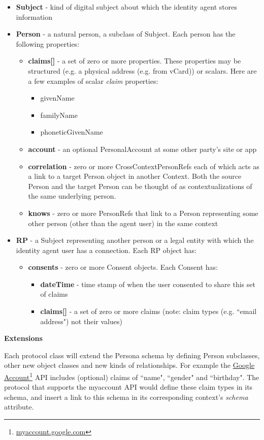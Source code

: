 \documentclass[11pt, oneside]{article}   	%
\newcommand{\hyperfootnote}[1][]{\def\ArgI{{#1}}\hyperfootnoteRelay}
\newcommand\hyperfootnoteRelay[2][]{\href{#1#2}{\ArgI}\footnote{\href{#1#2}{#2}}}
\begin{document}
\begin{itemize}
\item \textbf{Subject} - kind of digital subject about which the identity agent stores information
\item \textbf{Person} - a natural person, a subclass of Subject. Each person has the following properties:
	\begin{itemize}
	\item \textbf{claims[]} - a set of zero or more properties. These properties may be structured (e.g. a physical address (e.g. from vCard)) or scalars. Here are a few examples of scalar \emph{claim} properties: 
		\begin{itemize}
		\item givenName
		\item familyName
		\item phoneticGivenName
		\end{itemize}
	\item \textbf{account} - an optional PersonalAccount at some other party's site or app
	\item \textbf{correlation} - zero or more CrossContextPersonRefs each of which acts as a link to a target Person object in another Context. Both the source Person and the target Person can be thought of as contextualizations of the same underlying person.
	\item \textbf{knows} - zero or more PersonRefs that link to a Person representing some other person (other than the  agent user) in the same context
	\end{itemize}
\item \textbf{RP} - a Subject representing another person or a legal entity with which the identity agent user has a connection. Each RP object has:
	\begin {itemize}
	\item \textbf{consents} - zero or more Consent objects. Each Consent has:
		\begin{itemize}
		\item \textbf{dateTime} - time stamp of when the user consented to share this set of claims
		\item \textbf{claims[]}  - a set of zero or more claims (note: claim types (e.g. ``email address") not their values)
		\end{itemize}
	\end{itemize}
\end{itemize}

\textbf{Extensions}

Each protocol class will extend the Persona schema by defining Person subclasses, other new object classes and new kinds of relationships. For example the \hyperfootnote[Google Account][https://]{myaccount.google.com}  API includes (optional) claims of ``name", ``gender" and ``birthday". The protocol that supports the myaccount API would define these claim types in its schema, and insert a link to this schema in its corresponding context's \emph{schema} attribute.
\end{document}

